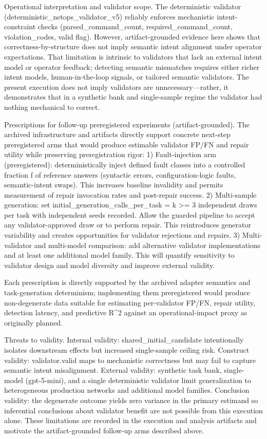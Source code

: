 \documentclass[conference]{IEEEtran}
\begin{document}
Operational interpretation and validator scope. The deterministic validator (deterministic\_netops\_validator\_v5) reliably enforces mechanistic intent-constraint checks (parsed\_command\_count, required\_command\_count, violation\_codes, valid flag). However, artifact-grounded evidence here shows that correctness-by-structure does not imply semantic intent alignment under operator expectations. That limitation is intrinsic to validators that lack an external intent model or operator feedback; detecting semantic mismatches requires either richer intent models, human-in-the-loop signals, or tailored semantic validators. The present execution does not imply validators are unnecessary---rather, it demonstrates that in a synthetic bank and single-sample regime the validator had nothing mechanical to correct.

Prescriptions for follow-up preregistered experiments (artifact-grounded). The archived infrastructure and artifacts directly support concrete next-step preregistered arms that would produce estimable validator FP/FN and repair utility while preserving preregistration rigor:
  1) Fault-injection arm (preregistered): deterministically inject defined fault classes into a controlled fraction f of reference answers (syntactic errors, configuration-logic faults, semantic-intent swaps). This increases baseline invalidity and permits measurement of repair invocation rates and post-repair success.
  2) Multi-sample generation: set initial\_generation\_calls\_per\_task = k >= 3 independent draws per task with independent seeds recorded. Allow the guarded pipeline to accept any validator-approved draw or to perform repair. This reintroduces generator variability and creates opportunities for validator rejections and repairs.
  3) Multi-validator and multi-model comparison: add alternative validator implementations and at least one additional model family. This will quantify sensitivity to validator design and model diversity and improve external validity.

Each prescription is directly supported by the archived adapter semantics and task-generation determinism; implementing them preregistered would produce non-degenerate data suitable for estimating per-validator FP/FN, repair utility, detection latency, and predictive R\textasciicircum{}2 against an operational-impact proxy as originally planned.

Threats to validity. Internal validity: shared\_initial\_candidate intentionally isolates downstream effects but increased single-sample ceiling risk. Construct validity: validator.valid maps to mechanistic correctness but may fail to capture semantic intent misalignment. External validity: synthetic task bank, single-model (gpt-5-mini), and a single deterministic validator limit generalization to heterogeneous production networks and additional model families. Conclusion validity: the degenerate outcome yields zero variance in the primary estimand so inferential conclusions about validator benefit are not possible from this execution alone. These limitations are recorded in the execution and analysis artifacts and motivate the artifact-grounded follow-up arms described above.
\end{document}

